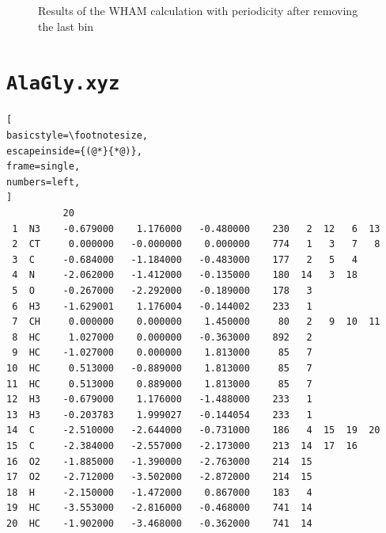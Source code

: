 \documentclass[a4paper,11pt]{scrartcl}
\begin{document}
\begin{figure} [htb]
	\caption{Results of the WHAM calculation with periodicity after removing the last bin}
	\label{fig:wham_180}
\end{figure}


\FloatBarrier
\newpage

\printacronyms[include-classes=abbrev,name=Abbreviations]

\newpage

\printbibliography

\newpage

\appendix
\section{\texttt{AlaGly.xyz}}
\label{app:alaglytinker}
\begin{lstlisting}[
basicstyle=\footnotesize,
escapeinside={(@*}{*@)},
frame=single,
numbers=left,
]
          20  
 1  N3    -0.679000    1.176000   -0.480000    230   2  12   6  13
 2  CT     0.000000   -0.000000    0.000000    774   1   3   7   8
 3  C     -0.684000   -1.184000   -0.483000    177   2   5   4
 4  N     -2.062000   -1.412000   -0.135000    180  14   3  18
 5  O     -0.267000   -2.292000   -0.189000    178   3
 6  H3    -1.629001    1.176004   -0.144002    233   1
 7  CH     0.000000    0.000000    1.450000     80   2   9  10  11
 8  HC     1.027000    0.000000   -0.363000    892   2
 9  HC    -1.027000    0.000000    1.813000     85   7
10  HC     0.513000   -0.889000    1.813000     85   7
11  HC     0.513000    0.889000    1.813000     85   7
12  H3    -0.679000    1.176000   -1.488000    233   1
13  H3    -0.203783    1.999027   -0.144054    233   1
14  C     -2.510000   -2.644000   -0.731000    186   4  15  19  20
15  C     -2.384000   -2.557000   -2.173000    213  14  17  16
16  O2    -1.885000   -1.390000   -2.763000    214  15
17  O2    -2.712000   -3.502000   -2.872000    214  15
18  H     -2.150000   -1.472000    0.867000    183   4
19  HC    -3.553000   -2.816000   -0.468000    741  14
20  HC    -1.902000   -3.468000   -0.362000    741  14
\end{lstlisting}
\end{document}
